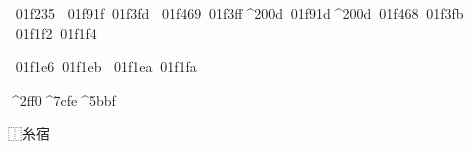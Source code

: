 \documentclass{article}
\begin{document}
\EmojiFont
^^^^^^01f235
^^^^^^01f91f^^^^^^01f3fd
^^^^^^01f469^^^^^^01f3ff^^^^200d^^^^^^01f91d^^^^200d^^^^^^01f468^^^^^^01f3fb
^^^^^^01f1f2^^^^^^01f1f4

^^^^^^01f1e6^^^^^^01f1eb
^^^^^^01f1ea^^^^^^01f1fa

\UFont
^^^^2ff0^^^^7cfe^^^^5bbf

⿰糸宿
\end{document}
